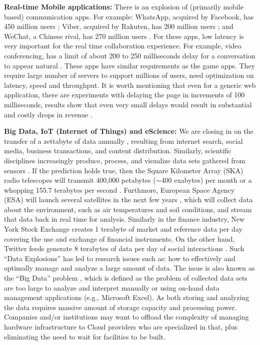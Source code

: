 \textbf{Real-time Mobile applications:} There is an explosion of
(primarily mobile based) communication apps. For example: WhatsApp, acquired by Facebook, has  450 million users \cite{ref7};
Viber, acquired by Rakuten, has 200 million users \cite{ref8};
and WeChat, a Chinese rival, has 270 million users \cite{ref9}.
For these apps, low latency is very important for the real time collaboration experience. For example, video conferencing, has a limit of about 200 to 250 milliseconds delay for a conversation to appear natural \cite{weinman2011time}. These apps have similar requirements as the game apps. They require large number of servers to support millions of users, need optimization on latency, speed and throughput. It is worth mentioning that even for a generic web application, there are experiments with delaying the page in increments of 100 milliseconds, results show that even very small delays would result in substantial and costly drops in revenue \cite{weinman2011time}.

\textbf{Big Data, IoT (Internet of Things) and eScience:} We are closing in on the transfer of a zettabyte of data annually \cite{ref11}, resulting from internet search, social media, business transactions, and content distribution. Similarly, scientific disciplines increasingly produce, process, and visualize data sets gathered from sensors \cite{GHadoop}. If the prediction holds true, then the Square Kilometer Array (SKA) radio telescopes will transmit 400,000 petabytes ($\sim$400 exabytes) per month or a whopping 155.7 terabytes per second \cite{ref12}. Furthmore, European Space Agency (ESA) will launch several satellites in the next few years \cite{ref13}, which will collect data about the environment, such as air temperatures and soil conditions, and stream that data back in real time for analysis.  Similarly in the finance industry, New York Stock Exchange creates 1 terabyte of market and reference data per day covering the use and exchange of financial instruments. On the other hand, Twitter feeds generate 8 terabytes of data per day of social interactions \cite{ref14}. Such \enquote{Data Explosions} has led to research issues such as: how to effectively and optimally manage and analyze a large amount of data. The issue is also known as the \enquote{Big Data} problem \cite{hey2003data}, which is defined as the problem of collected data sets are too large to analyze and interpret manually or using on-hand data management applications (e.g., Microsoft Excel). As both storing and analyzing the data requires massive amount of storage capacity and processing power. Companies and/or institutions may want to offload the complexity of managing hardware infrastructure to Cloud providers who are specialized in that, plus eliminating the need to wait for facilities to be built.


